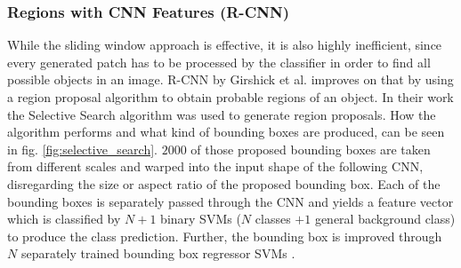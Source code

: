 



\subsubsection{Regions with CNN Features (R-CNN)}
While the sliding window approach is effective, it is also highly inefficient, since every generated patch has to be processed by the classifier in order to find all possible objects in an image.
\ac{R-CNN} by Girshick et al. \cite{rcnn} improves on that by using a region proposal algorithm to obtain probable regions of an object.
In their work the Selective Search algorithm \cite{selective_search} was used to generate region proposals.
How the algorithm performs and what kind of bounding boxes are produced, can be seen in fig. \ref{fig:selective_search}.
$2000$ of those proposed bounding boxes are taken from different scales and warped into the input shape of the following \ac{CNN}, disregarding the size or aspect ratio of the proposed bounding box.
Each of the bounding boxes is separately passed through the \ac{CNN} and yields a feature vector which is classified by $N + 1$ binary \acp{SVM} ($N$ classes $+1$ general background class) to produce the class prediction.
Further, the bounding box is improved through $N$ separately trained bounding box regressor \acp{SVM} \cite{bbox_regressor}.

